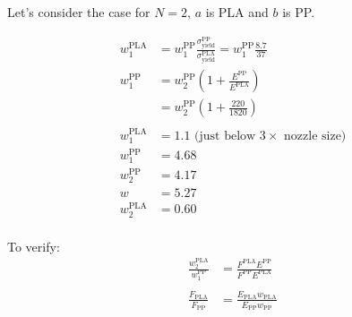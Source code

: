Let's consider the case for $N=2$, $a$ is PLA and $b$ is PP.

\begin{align*}
	w_1^\text{PLA} &= w_1^\text{PP} \frac{\sigma^\text{PP}_\text{yield}}{\sigma^\text{PLA}_\text{yield}} = w_1^\text{PP} \frac{8.7}{37} \\
	w^\text{PP}_1 &=  w_2^\text{PP} \left( 1 + \frac{E^\text{PP}}{E^\text{PLA}}  \right) \\
	&=  w_2^\text{PP} \left( 1 + \frac{220}{1820}  \right) \\
	\\
	w_1^\text{PLA} &= 1.1 \text{ (just below $3\times$ nozzle size)}\\
	w_1^\text{PP} &= 4.68 \\
	w_2^\text{PP} &= 4.17 \\
	w &= 5.27 \\
	w_2^\text{PLA} &= 0.60 \\
\end{align*}

To verify:
\begin{align*}
	\frac{w_2^\text{PLA}}{w_1^\text{PP}} &= \frac{F^\text{PLA} E^\text{PP}}{F^\text{PP} E^\text{PLA}} \\
	\\
	\frac{F_\text{PLA}}{F_\text{PP}} &= \frac{E_\text{PLA} w_\text{PLA}}{E_\text{PP} w_\text{PP}} \\
\end{align*}

